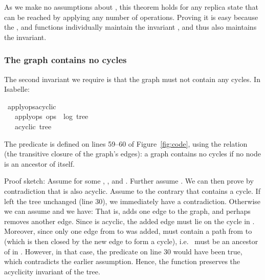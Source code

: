 \documentclass[sigplan,anonymous]{acmart}
\renewenvironment{isabelle}{%
  \medbreak\noindent%
  \renewcommand{\isanewline}{\\}%
  \begin{minipage}{\columnwidth}%
  \begin{isabellebody}%
  \begin{tabbing}%
}{%
  \end{tabbing}%
  \end{isabellebody}%
  \end{minipage}%
  \medbreak%
}
\renewcommand{\isacartoucheopen}{}
\renewcommand{\isacartoucheclose}{}
\begin{document}
As we make no assumptions about , this theorem holds for any replica state that can be reached by applying any number of operations.
Proving it is easy because the ,  and  functions individually maintain the invariant , and thus  also maintains the invariant.

\subsubsection{The graph contains no cycles}\label{sec:no-cycles}

The second invariant we require is that the graph must not contain any cycles.
In Isabelle:
\begin{isabelle}
\isamarkupfalse%
\ apply{\isacharunderscore}ops{\isacharunderscore}acyclic{\isacharcolon}\isanewline
\ \ \ {\isacartoucheopen}apply{\isacharunderscore}ops\ ops\ {\isacharequal}\ {\isacharparenleft}log{\isacharcomma}\ tree{\isacharparenright}{\isacartoucheclose}\isanewline
\ \ \ {\isacartoucheopen}acyclic\ tree{\isacartoucheclose}
\end{isabelle}
\noindent The  predicate is defined on lines 59--60 of Figure~\ref{fig:code}, using the  relation (the transitive closure of the graph's edges): a graph contains no cycles if no node is an ancestor of itself.

Proof sketch: Assume  for some , ,  and .
Further assume .
We can then prove by contradiction that  is also acyclic.
Assume to the contrary that  contains a cycle.
If  left the tree unchanged (line 30), we immediately have a contradiction.
Otherwise we can assume  and we have:
\medbreak\noindent
{}
\medbreak\noindent
That is,  adds one edge  to the graph, and perhaps removes another edge.
Since  is acyclic, the added edge must lie on the cycle in .
Moreover, since only one edge from  to  was added,  must contain a path from  to  (which is then closed by the new edge to form a cycle), i.e.\  must be an ancestor of  in .
However, in that case, the predicate  on line 30 would have been true, which contradicts the earlier assumption.
Hence, the  function preserves the acyclicity invariant of the tree.
\end{document}
